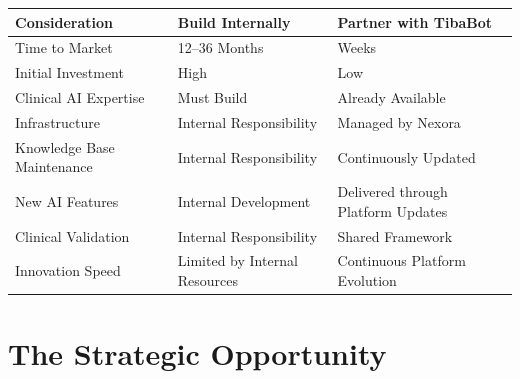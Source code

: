 \begin{center}

\renewcommand{\arraystretch}{1.5}

\begin{tabularx}{\textwidth}{|Y|Y|Y|}

\hline


\textbf{Consideration} &
\textbf{Build Internally} &
\textbf{Partner with TibaBot} \\

\hline

Time to Market &
12--36 Months &
Weeks \\

\hline

Initial Investment &
High &
Low \\

\hline

Clinical AI Expertise &
Must Build &
Already Available \\

\hline

Infrastructure &
Internal Responsibility &
Managed by Nexora \\

\hline

Knowledge Base Maintenance &
Internal Responsibility &
Continuously Updated \\

\hline

New AI Features &
Internal Development &
Delivered through Platform Updates \\

\hline

Clinical Validation &
Internal Responsibility &
Shared Framework \\

\hline

Innovation Speed &
Limited by Internal Resources &
Continuous Platform Evolution \\

\hline

\end{tabularx}

\end{center}


\section{The Strategic Opportunity}

